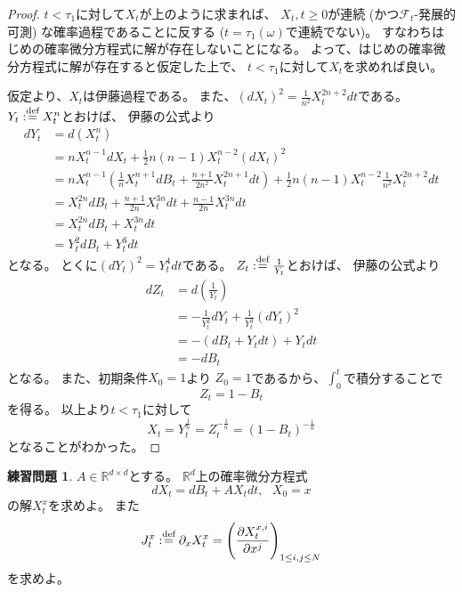 \documentclass[uplatex]{jsarticle}
\theoremstyle{definition}
\newtheorem{prob}[prob]{練習問題}
\def\R{\mathbb{R}}
\def\mcF{\mathcal{F}}
\def\dfn{:\overset{\mbox{{\scriptsize def}}}{=}}
\begin{document}
\begin{proof}
  \(t<\tau_1\)に対して\(X_t\)が上のように求まれば、
  \(X_t, t\geq 0\)が連続 (かつ\(\mcF_t\)-発展的可測) な確率過程であることに反する
  (\(t=\tau_1(\omega)\)で連続でない)。
  すなわちはじめの確率微分方程式に解が存在しないことになる。
  よって、はじめの確率微分方程式に解が存在すると仮定した上で、
  \(t<\tau_1\)に対して\(X_t\)を求めれば良い。

  仮定より、\(X_t\)は伊藤過程である。
  また、\((dX_t)^2 = \frac{1}{n^2}X_t^{2n+2}dt\)である。
  \(Y_t \dfn X_t^n\)とおけば、
  伊藤の公式より
  \begin{align*}
    dY_t
    &= d(X_t^n) \\
    &= nX_t^{n-1}dX_t + \frac{1}{2}n(n-1)X_t^{n-2}(dX_t)^2 \\
    &= nX_t^{n-1}\left( \frac{1}{n}X_t^{n+1}dB_t
    + \frac{n+1}{2n^2}X_t^{2n+1}dt\right)
    + \frac{1}{2}n(n-1)X_t^{n-2}\frac{1}{n^2}X_t^{2n+2}dt \\
    &= X_t^{2n}dB_t
    + \frac{n+1}{2n}X_t^{3n}dt
    + \frac{n-1}{2n}X_t^{3n}dt \\
    &= X_t^{2n}dB_t + X_t^{3n}dt \\
    &= Y_t^2dB_t + Y_t^3dt
  \end{align*}
  となる。
  とくに\((dY_t)^2 = Y_t^4dt\)である。
  \(Z_t \dfn \frac{1}{Y_t}\)とおけば、
  伊藤の公式より
  \begin{align*}
    dZ_t
    &= d\left( \frac{1}{Y_t}\right) \\
    &= -\frac{1}{Y_t^2}dY_t + \frac{1}{Y_t^3}(dY_t)^2 \\
    &= -(dB_t+Y_tdt) + Y_tdt \\
    &= -dB_t
  \end{align*}
  となる。
  また、初期条件\(X_0=1\)より
  \(Z_0 = 1\)であるから、\(\int_0^t\)で積分することで
  \[
  Z_t = 1-B_t
  \]
  を得る。
  以上より\(t < \tau_1\)に対して
  \[
  X_t = Y_t^{\frac{1}{n}} = Z_t^{-\frac{1}{n}} = (1-B_t)^{-\frac{1}{n}}
  \]
  となることがわかった。
\end{proof}


















\begin{prob}\label{prob: 5.3}
  \(A\in \R^{d\times d}\)とする。
  \(\R^d\)上の確率微分方程式
  \[
  dX_t = dB_t + AX_t dt, \ \ \ X_0 = x
  \]
  の解\(X_t^x\)を求めよ。
  また
  \[
  J_t^x \dfn \partial_x X_t^x =
  \left( \frac{\partial X_t^{x,i}}{\partial x^j} \right)_{1\leq i,j \leq N}
  \]
  を求めよ。
\end{prob}
\end{document}
